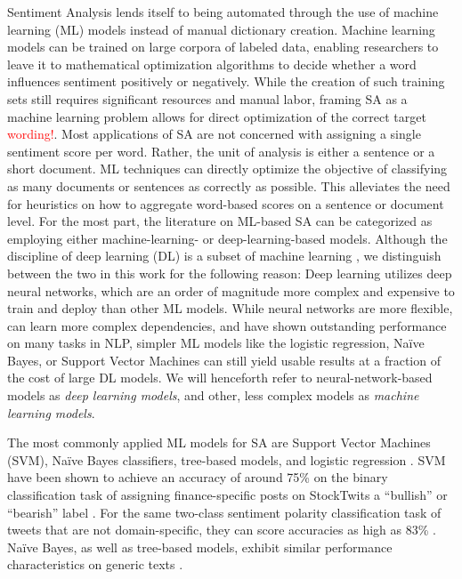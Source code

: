 Sentiment Analysis lends itself to being automated through the use of machine learning (ML) models instead of manual dictionary creation. Machine learning models can be trained on large corpora of labeled data, enabling researchers to leave it to mathematical optimization algorithms to decide whether a word influences sentiment positively or negatively. While the creation of such training sets still requires significant resources and manual labor, framing SA as a machine learning problem allows for direct optimization of the correct target \textcolor{red}{wording!}. Most applications of SA are not concerned with assigning a single sentiment score per word. Rather, the unit of analysis is either a sentence or a short document. ML techniques can directly optimize the objective of classifying as many documents or sentences as correctly as possible. This alleviates the need for heuristics on how to aggregate word-based scores on a sentence or document level.\newline
For the most part, the literature on ML-based SA can be categorized as employing either machine-learning- or deep-learning-based models. Although the discipline of deep learning (DL) is a subset of machine learning , we distinguish between the two in this work for the following reason: Deep learning utilizes deep neural networks, which are an order of magnitude more complex and expensive to train and deploy than other ML models. While neural networks are more flexible, can learn more complex dependencies, and have shown outstanding performance on many tasks in NLP, simpler ML models like the logistic regression, Na\"ive Bayes, or Support Vector Machines can still yield usable results at a fraction of the cost of large DL models. We will henceforth refer to neural-network-based models as \emph{deep learning models}, and other, less complex models as \emph{machine learning models}.

The most commonly applied ML models for SA are Support Vector Machines (SVM), Na\"ive Bayes classifiers, tree-based models, and logistic regression . SVM have been shown to achieve an accuracy of around 75\% on the binary classification task of assigning finance-specific posts on StockTwits a ``bullish'' or ``bearish'' label \cite{renault2020sentiment}. For the same two-class sentiment polarity classification task of tweets that are not domain-specific, they can score accuracies as high as 83\% \cite{mishev2020evaluation, tang2014learning}. Na\"ive Bayes, as well as tree-based models, exhibit similar performance characteristics on generic texts . 

